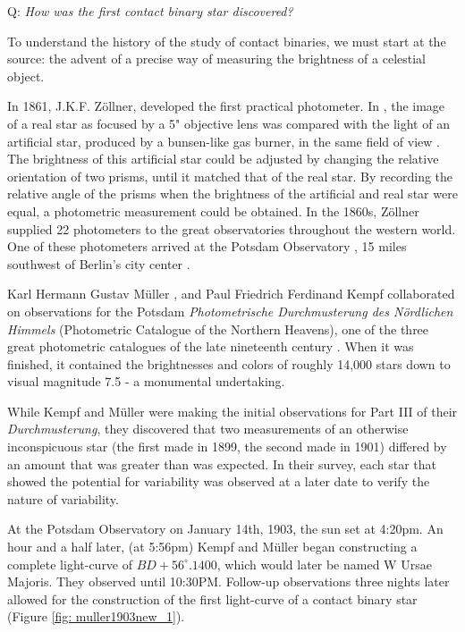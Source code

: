 \documentclass[12pt]{article} %
\numberwithin{equation}{section} %
\begin{document}
Q: \emph{How was the first contact binary star discovered?}

To understand the history of the study of contact binaries, we must start at the source: the advent of a precise way of measuring the brightness of a celestial object.  

In 1861, J.K.F. Z\"ollner, developed the first practical photometer. In , the image of a real star as focused by a 5" objective lens was compared with the light of an artificial star, produced by a bunsen-like gas burner, in the same field of view \citep{staubermann2000trouble}. The brightness of this artificial star could be adjusted by changing the relative orientation of two prisms, until it matched that of the real star. By recording the relative angle of the prisms when the brightness of the artificial and real star were equal, a photometric measurement could be obtained. In the 1860s, Z\"ollner supplied 22 photometers to the great observatories throughout the western world. One of these photometers arrived at the Potsdam Observatory , 15 miles southwest of Berlin's city center \citep{krisciunas2001brief}.

Karl Hermann Gustav M\"uller , and Paul Friedrich Ferdinand Kempf  collaborated on observations for the Potsdam \emph{Photometrische Durchmusterung des N\"ordlichen Himmels} (Photometric Catalogue of the Northern Heavens), one of the three great photometric catalogues of the late nineteenth century \citep{bolt2007biographical}. When it was finished, it contained the brightnesses and colors of roughly 14,000 stars down to visual magnitude 7.5 - a monumental undertaking.

While Kempf and M\"uller were making the initial observations for Part III of their \emph{Durchmusterung}, they discovered that two measurements of an otherwise inconspicuous star (the first made in 1899, the second made in 1901) differed by an amount that was greater than was expected. In their survey, each star that showed the potential for variability was observed at a later date to verify the nature of variability.

At the Potsdam Observatory on January 14th, 1903, the sun set at 4:20pm. An hour and a half later, (at 5:56pm) Kempf and M\"uller began constructing a complete light-curve of $BD +56^{\circ}.1400$, which would later be named W Ursae Majoris. They observed until 10:30PM. Follow-up observations three nights later allowed for the construction of the first light-curve of a contact binary star (Figure \ref{fig: muller1903new_1}).
\end{document}

